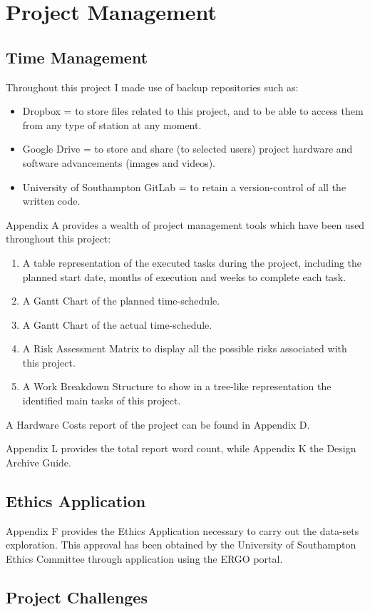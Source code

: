 \chapter{Project Management}

\label{ch:management}
\setlength\lineskip{0pt}
\vspace*{15pt}

\section{Time Management}
Throughout this project I made use of backup repositories such as:

\begin{itemize}
\itemsep0em
\item Dropbox = to store files related to this project, and to be able to access them from any type of station at any moment.
\item Google Drive = to store and share (to selected users) project hardware and software advancements (images and videos).
\item University of Southampton GitLab = to retain a version-control of all the written code.
\end{itemize}

Appendix A provides a wealth of project management tools which have been used throughout this project:

\begin{enumerate}
\itemsep0em
\item A table representation of the executed tasks during the project, including the planned start date, months of execution and weeks to complete each task. 
\item A Gantt Chart of the planned time-schedule.
\item A Gantt Chart of the actual time-schedule.
\item A Risk Assessment Matrix to display all the possible risks associated with this project.
\item A Work Breakdown Structure to show in a tree-like representation the identified main tasks of this project. 
\end{enumerate}

A Hardware Costs report of the project can be found in Appendix D.

Appendix L provides the total report word count, while Appendix K the Design Archive Guide.

\section{Ethics Application}
Appendix F provides the Ethics Application necessary to carry out the data-sets exploration. This approval has been obtained by the University of Southampton Ethics Committee through application using the ERGO  portal.

\section{Project Challenges}